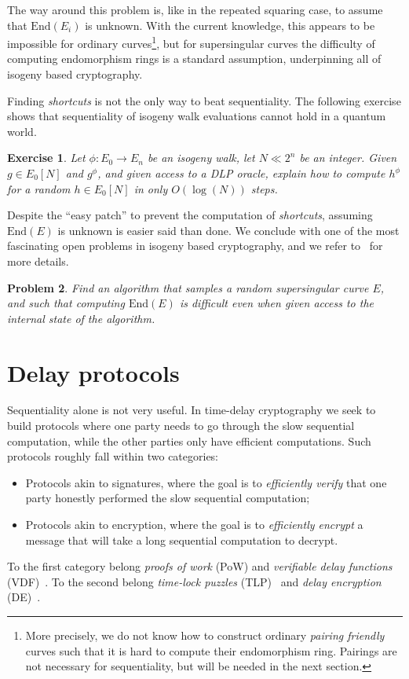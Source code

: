 \documentclass{article}
\newtheorem{ex}{Exercise}
\newtheorem{prob}[ex]{Problem}
\def\End{\mathrm{End}}
\begin{document}
The way around this problem is, like in the repeated squaring case, to
assume that $\End(E_i)$ is unknown.  With the current knowledge, this
appears to be impossible for ordinary curves\footnote{More precisely,
  we do not know how to construct ordinary \emph{pairing friendly}
  curves such that it is hard to compute their endomorphism ring.
  Pairings are not necessary for sequentiality, but will be needed in
  the next section.}, but for supersingular curves the difficulty of
computing endomorphism rings is a standard assumption, underpinning
all of isogeny based cryptography.

Finding \emph{shortcuts} is not the only way to beat sequentiality.
The following exercise shows that sequentiality of isogeny walk
evaluations cannot hold in a quantum world.

\begin{ex}
  Let $\phi:E_0\to E_n$ be an isogeny walk, let $N\ll 2^n$ be an
  integer.  Given $g\in E_0[N]$ and $g^\phi$, and given access to a
  DLP oracle, explain how to compute $h^\phi$ for a random
  $h\in E_0[N]$ in only $O(\log(N))$ steps.
\end{ex}

Despite the ``easy patch'' to prevent the computation of
\emph{shortcuts}, assuming $\End(E)$ is unknown is easier said than
done.  We conclude with one of the most fascinating open problems in
isogeny based cryptography, and we refer
to~\cite{AC:DMPS19,EPRINT:BurDeF20} for more details.

\begin{prob}
  \label{prob:hash}
  Find an algorithm that samples a random supersingular curve $E$, and
  such that computing $\End(E)$ is difficult even when given access to
  the internal state of the algorithm.
\end{prob}


\section{Delay protocols}

Sequentiality alone is not very useful.  In time-delay cryptography we
seek to build protocols where one party needs to go through the slow
sequential computation, while the other parties only have efficient
computations.  Such protocols roughly fall within two categories:
\begin{itemize}
\item Protocols akin to signatures, where the goal is to
  \emph{efficiently verify} that one party honestly performed the slow
  sequential computation;
\item Protocols akin to encryption, where the goal is to
  \emph{efficiently encrypt} a message that will take a long
  sequential computation to decrypt.
\end{itemize}
To the first category belong \emph{proofs of work} (PoW) and
\emph{verifiable delay functions} (VDF)~\cite{C:BBBF18}.  To the
second belong \emph{time-lock puzzles} (TLP)~\cite{TLP} and
\emph{delay encryption} (DE)~\cite{EPRINT:BurDeF20}.
\end{document}
